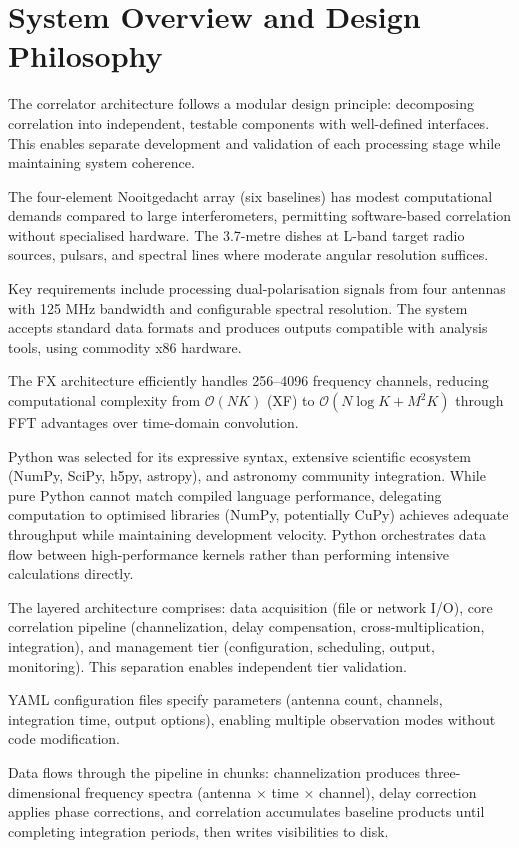 \section{System Overview and Design Philosophy}

The correlator architecture follows a modular design principle: decomposing correlation into independent, testable components with well-defined interfaces. This enables separate development and validation of each processing stage while maintaining system coherence.

The four-element Nooitgedacht array (six baselines) has modest computational demands compared to large interferometers, permitting software-based correlation without specialised hardware. The 3.7-metre dishes at L-band target radio sources, pulsars, and spectral lines where moderate angular resolution suffices.

Key requirements include processing dual-polarisation signals from four antennas with 125 MHz bandwidth and configurable spectral resolution. The system accepts standard data formats and produces outputs compatible with analysis tools, using commodity x86 hardware.

The FX architecture efficiently handles 256–4096 frequency channels, reducing computational complexity from $\mathcal{O}(NK)$ (XF) to $\mathcal{O}(N\log K + M^2K)$ through FFT advantages over time-domain convolution.

Python was selected for its expressive syntax, extensive scientific ecosystem (NumPy, SciPy, h5py, astropy), and astronomy community integration. While pure Python cannot match compiled language performance, delegating computation to optimised libraries (NumPy, potentially CuPy) achieves adequate throughput while maintaining development velocity. Python orchestrates data flow between high-performance kernels rather than performing intensive calculations directly.

The layered architecture comprises: data acquisition (file or network I/O), core correlation pipeline (channelization, delay compensation, cross-multiplication, integration), and management tier (configuration, scheduling, output, monitoring). This separation enables independent tier validation.

YAML configuration files specify parameters (antenna count, channels, integration time, output options), enabling multiple observation modes without code modification.

Data flows through the pipeline in chunks: channelization produces three-dimensional frequency spectra (antenna × time × channel), delay correction applies phase corrections, and correlation accumulates baseline products until completing integration periods, then writes visibilities to disk.

